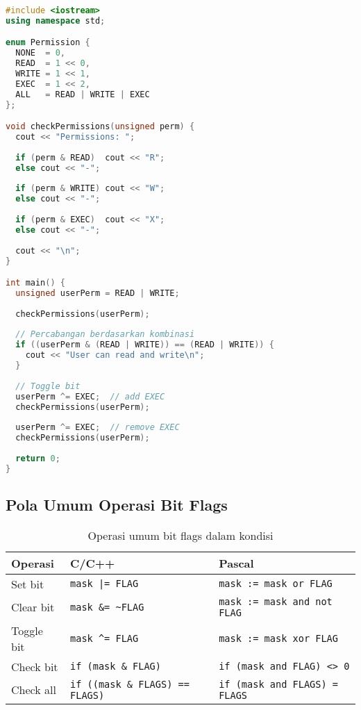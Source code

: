 \documentclass[../main.tex]{subfiles}
\begin{document}
\begin{lstlisting}[language=C++, caption={Bitwise flags dengan switch di C++}]
#include <iostream>
using namespace std;

enum Permission {
  NONE  = 0,
  READ  = 1 << 0,
  WRITE = 1 << 1,
  EXEC  = 1 << 2,
  ALL   = READ | WRITE | EXEC
};

void checkPermissions(unsigned perm) {
  cout << "Permissions: ";
  
  if (perm & READ)  cout << "R";
  else cout << "-";
  
  if (perm & WRITE) cout << "W";
  else cout << "-";
  
  if (perm & EXEC)  cout << "X";
  else cout << "-";
  
  cout << "\n";
}

int main() {
  unsigned userPerm = READ | WRITE;
  
  checkPermissions(userPerm);
  
  // Percabangan berdasarkan kombinasi
  if ((userPerm & (READ | WRITE)) == (READ | WRITE)) {
    cout << "User can read and write\n";
  }
  
  // Toggle bit
  userPerm ^= EXEC;  // add EXEC
  checkPermissions(userPerm);
  
  userPerm ^= EXEC;  // remove EXEC
  checkPermissions(userPerm);
  
  return 0;
}
\end{lstlisting}

\subsection{Pola Umum Operasi Bit Flags}
\begin{table}[H]
  \centering
  \caption{Operasi umum bit flags dalam kondisi}
  \begin{tabular}{@{}lll@{}}
    \toprule
    Operasi & C/C++ & Pascal \\
    \midrule
    Set bit & \texttt{mask |= FLAG} & \texttt{mask := mask or FLAG} \\
    Clear bit & \texttt{mask \&= \~{}FLAG} & \texttt{mask := mask and not FLAG} \\
    Toggle bit & \texttt{mask \^{}= FLAG} & \texttt{mask := mask xor FLAG} \\
    Check bit & \texttt{if (mask \& FLAG)} & \texttt{if (mask and FLAG) {\textless}{\textgreater} 0} \\
    Check all & \texttt{if ((mask \& FLAGS) == FLAGS)} & \texttt{if (mask and FLAGS) = FLAGS} \\
    \bottomrule
  \end{tabular}
\end{table}
\end{document}
